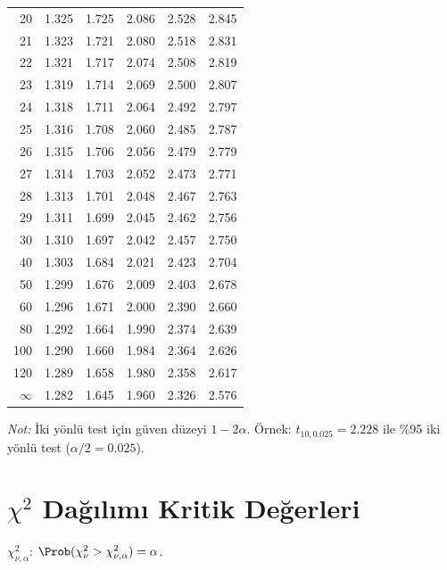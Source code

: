 \begin{center}
\begin{tabular}{r|ccccc}
20 & 1.325 & 1.725 &  2.086 &  2.528 &  2.845 \\
21 & 1.323 & 1.721 &  2.080 &  2.518 &  2.831 \\
22 & 1.321 & 1.717 &  2.074 &  2.508 &  2.819 \\
23 & 1.319 & 1.714 &  2.069 &  2.500 &  2.807 \\
24 & 1.318 & 1.711 &  2.064 &  2.492 &  2.797 \\
25 & 1.316 & 1.708 &  2.060 &  2.485 &  2.787 \\
26 & 1.315 & 1.706 &  2.056 &  2.479 &  2.779 \\
27 & 1.314 & 1.703 &  2.052 &  2.473 &  2.771 \\
28 & 1.313 & 1.701 &  2.048 &  2.467 &  2.763 \\
29 & 1.311 & 1.699 &  2.045 &  2.462 &  2.756 \\
30 & 1.310 & 1.697 &  2.042 &  2.457 &  2.750 \\
40 & 1.303 & 1.684 &  2.021 &  2.423 &  2.704 \\
50 & 1.299 & 1.676 &  2.009 &  2.403 &  2.678 \\
60 & 1.296 & 1.671 &  2.000 &  2.390 &  2.660 \\
80 & 1.292 & 1.664 &  1.990 &  2.374 &  2.639 \\
100 & 1.290 & 1.660 & 1.984 &  2.364 &  2.626 \\
120 & 1.289 & 1.658 & 1.980 &  2.358 &  2.617 \\
$\infty$ & 1.282 & 1.645 & 1.960 & 2.326 & 2.576 \\
\hline
\end{tabular}
\end{center}

\noindent\textit{Not:} İki yönlü test için güven düzeyi $1-2\alpha$. Örnek: $t_{10,0.025}=2.228$ ile \%95 iki yönlü test ($\alpha/2=0.025$).

\section{$\chi^2$ Dağılımı Kritik Değerleri}
\label{app:chi2_tablo}

$\chi^2_{\nu,\alpha}$: $\Prob(\chi^2_\nu > \chi^2_{\nu,\alpha}) = \alpha$.

